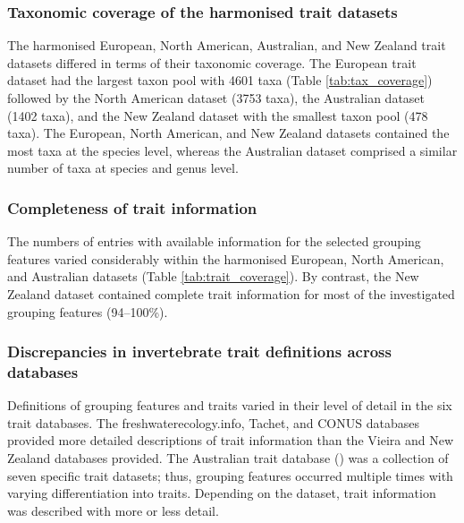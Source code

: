 \documentclass[12pt]{article}
\begin{document}
\subsubsection*{Taxonomic coverage of the harmonised trait datasets}

The harmonised European, North American, Australian, and New Zealand trait datasets differed in terms of their taxonomic coverage. The European trait dataset had the largest taxon pool with 4601 taxa (Table \ref{tab:tax_coverage}) followed by the North American dataset (3753 taxa), the Australian dataset (1402 taxa), and the New Zealand dataset with the smallest taxon pool (478 taxa). The European, North American, and New Zealand datasets contained the most taxa at the species level, whereas the Australian dataset comprised a similar number of taxa at species and genus level.


\subsubsection*{Completeness of trait information}

The numbers of entries with available information for the selected grouping features varied considerably within the harmonised European, North American, and Australian datasets (Table \ref{tab:trait_coverage}). By contrast, the New Zealand dataset contained complete trait information for most of the investigated grouping features (94–100\%).


\subsubsection*{Discrepancies in invertebrate trait definitions across databases}

Definitions of grouping features and traits varied in their level of detail in the six trait databases. The freshwaterecology.info, Tachet, and CONUS databases provided more detailed descriptions of trait information than the Vieira and New Zealand databases provided. The Australian trait database (\cite{keffordIntegratedDatabaseStream2020a}) was a collection of seven specific trait datasets; thus, grouping features occurred multiple times with varying differentiation into traits. Depending on the dataset, trait information was described with more or less detail.
\end{document}
